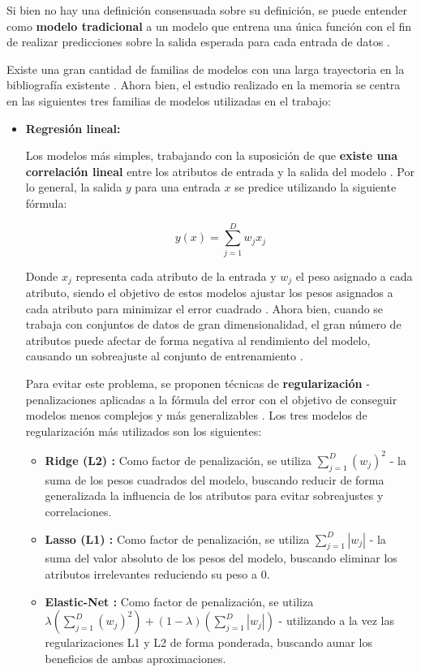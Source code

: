Si bien no hay una definición consensuada sobre su definición, se puede entender como \textbf{modelo tradicional} a un modelo que entrena una única función con el fin de realizar predicciones sobre la salida esperada para cada entrada de datos \cite{aima}.

Existe una gran cantidad de familias de modelos con una larga trayectoria en la bibliografía existente \cite{Burkov2019TheHM}. Ahora bien, el estudio realizado en la memoria se centra en las siguientes tres familias de modelos utilizadas en el trabajo:

\begin{itemize}[leftmargin=*]
	\item \textbf{Regresión lineal:} 
	
	Los modelos más simples, trabajando con la suposición de que \textbf{existe una correlación lineal} entre los atributos de entrada y la salida del modelo \cite{mlprobabilistic}. Por lo general, la salida $y$ para una entrada $x$ se predice utilizando la siguiente fórmula: 

	$$y(x) = \sum_{j=1}^{D}w_j x_j$$
	
	Donde $x_j$ representa cada atributo de la entrada y $w_j$ el peso asignado a cada atributo, siendo el objetivo de estos modelos ajustar los pesos asignados a cada atributo para minimizar el error cuadrado \cite{aima}. Ahora bien, cuando se trabaja con conjuntos de datos de gran dimensionalidad, el gran número de atributos puede afectar de forma negativa al rendimiento del modelo, causando un sobreajuste al conjunto de entrenamiento \cite{l1l2}.
	
	Para evitar este problema, se proponen técnicas de \textbf{regularización} - penalizaciones aplicadas a la fórmula del error con el objetivo de conseguir modelos menos complejos y más generalizables \cite{elasticnet}. Los tres modelos de regularización más utilizados son los siguientes:
	
	\begin{itemize}
		\item \textbf{Ridge (L2) \cite{ridge}:} Como factor de penalización, se utiliza $\sum_{j=1}^D(w_j)^2$ - la suma de los pesos cuadrados del modelo, buscando reducir de forma generalizada la influencia de los atributos para evitar sobreajustes y correlaciones.
		\item \textbf{Lasso (L1) \cite{lasso}:} Como factor de penalización, se utiliza $\sum_{j=1}^D|w_j|$ - la suma del valor absoluto de los pesos del modelo, buscando eliminar los atributos irrelevantes reduciendo su peso a $0$.
		\item \textbf{Elastic-Net \cite{elasticnet}:} Como factor de penalización, se utiliza $\lambda\left(\sum_{j=1}^D(w_j)^2\right) + (1-\lambda)\left(\sum_{j=1}^D|w_j|\right)$ - utilizando a la vez las regularizaciones L1 y L2 de forma ponderada, buscando aunar los beneficios de ambas aproximaciones.
	\end{itemize}


\end{itemize}
